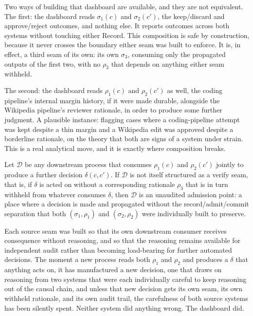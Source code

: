 Two ways of building that dashboard are available, and they are not equivalent. The first: the dashboard reads $\sigma_1(c)$ and $\sigma_2(c')$, the keep/discard and approve/reject outcomes, and nothing else. It reports outcomes across both systems without touching either $\mathrm{Record}$. This composition is safe by construction, because it never crosses the boundary either seam was built to enforce. It is, in effect, a third seam of its own: its own $\sigma_3$, consuming only the propagated outputs of the first two, with no $\rho_3$ that depends on anything either seam withheld.

The second: the dashboard reads $\rho_1(c)$ and $\rho_2(c')$ as well, the coding pipeline's internal margin history, if it were made durable, alongside the Wikipedia pipeline's reviewer rationale, in order to produce some further judgment. A plausible instance: flagging cases where a coding-pipeline attempt was kept despite a thin margin and a Wikipedia edit was approved despite a borderline rationale, on the theory that both are signs of a system under strain. This is a real analytical move, and it is exactly where composition breaks.

\begin{proposition}
Let $\mathcal{D}$ be any downstream process that consumes $\rho_1(c)$ and $\rho_2(c')$ jointly to produce a further decision $\delta(c,c')$. If $\mathcal{D}$ is not itself structured as a verify seam, that is, if $\delta$ is acted on without a corresponding rationale $\rho_3$ that is in turn withheld from whatever consumes $\delta$, then $\mathcal{D}$ is an unaudited admission point: a place where a decision is made and propagated without the record/admit/commit separation that both $(\sigma_1,\rho_1)$ and $(\sigma_2,\rho_2)$ were individually built to preserve.
\end{proposition}

Each source seam was built so that its own downstream consumer receives consequence without reasoning, and so that the reasoning remains available for independent audit rather than becoming load-bearing for further automated decisions. The moment a new process reads both $\rho_1$ and $\rho_2$ and produces a $\delta$ that anything acts on, it has manufactured a new decision, one that draws on reasoning from two systems that were each individually careful to keep reasoning out of the causal chain, and unless that new decision gets its own seam, its own withheld rationale, and its own audit trail, the carefulness of both source systems has been silently spent. Neither system did anything wrong. The dashboard did.

